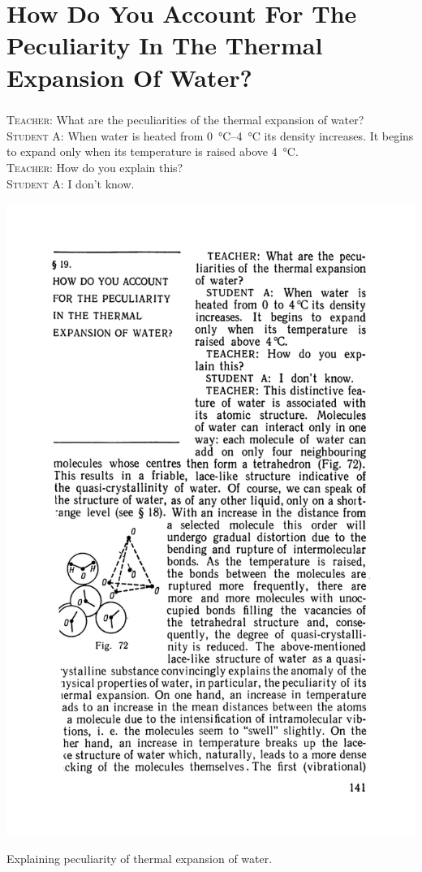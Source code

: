\documentclass[a4paper,sfsidenotes]{tufte-book}
\begin{document}
\chapter{How Do You Account For The Peculiarity In The Thermal Expansion Of Water?}
\label{ch-19}
\paragraph{}
\textsc{Teacher:} What are the peculiarities of the thermal expansion of water?
\\
\textsc{Student A:} When water is heated from \SIrange{0}{4}{\degreeCelsius} its density increases. It begins to expand only when its temperature is raised above \SI{4}{\degreeCelsius}.
\\
\textsc{Teacher:} How do you explain this?
\\
\textsc{Student A:} I don't know.
\\
\begin{marginfigure}
\centering
\includegraphics[width=\linewidth]{fig-072a}
\caption{Explaining peculiarity of thermal expansion of water.}
\label{fig-72}
\end{marginfigure}
\end{document}
